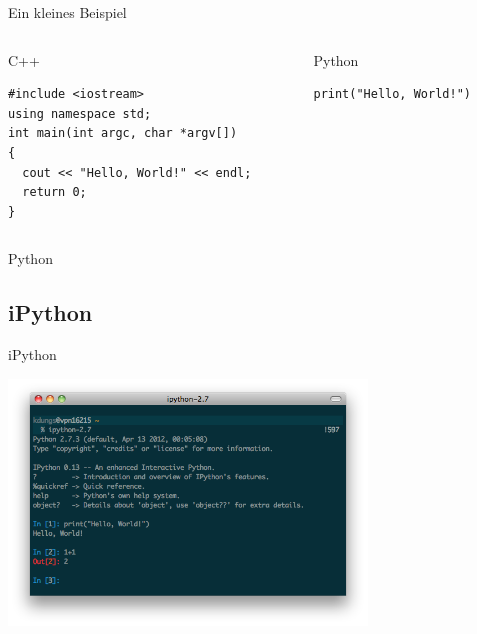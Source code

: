 \begin{frame}[fragile]{Ein kleines Beispiel}
  \vspace{-1em}
  \begin{columns}
    \begin{column}{0.5\textwidth}
      \begin{exampleblock}{C++}
        \begin{verbatim}
#include <iostream>
using namespace std;
int main(int argc, char *argv[])
{
  cout << "Hello, World!" << endl;
  return 0;
}
        \end{verbatim}
      \end{exampleblock}
    \end{column}
    \begin{column}{0.5\textwidth}
      \begin{exampleblock}{Python}
        \begin{verbatim}
print("Hello, World!")
        \end{verbatim}
      \end{exampleblock}
    \end{column}
  \end{columns}
\end{frame}

  \begin{frame}{Python}
    \tableofcontents[sectionstyle=show/hide,
                     subsectionstyle=show/show/hide,
                     subsubsectionstyle=show/show/show]
  \end{frame}

  \subsection{iPython}
    \begin{frame}{iPython}
      \vspace{-3em}
      \begin{center}
        \includegraphics[width=360px]{img/ipython.png}
      \end{center}
    \end{frame}

